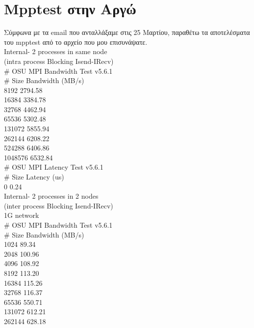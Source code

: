 \section*{Mpptest στην Αργώ}
Σύμφωνα με τα email που ανταλλάξαμε στις 25 Μαρτίου, παραθέτω τα αποτελέσματα του mpptest από το αρχείο που μου επισυνάψατε. \\
\newline
Internal- 2 processes in same node \\
(intra process Blocking Isend-IRecv) \\
\# OSU MPI Bandwidth Test v5.6.1 \\
\# Size      Bandwidth (MB/s) \\
8192                 2794.58 \\
16384                3384.78 \\
32768                4462.94 \\
65536                5302.48 \\
131072               5855.94 \\
262144               6208.22 \\
524288               6406.86 \\
1048576              6532.84 \\
\# OSU MPI Latency Test v5.6.1 \\
\# Size          Latency (us) \\
0                       0.24 \\
\newline
Internal- 2 processes in 2 nodes \\
(inter process Blocking Isend-IRecv) \\
1G network \\
\# OSU MPI Bandwidth Test v5.6.1 \\
\# Size      Bandwidth (MB/s) \\
1024                   89.34 \\
2048                  100.96 \\
4096                  108.92 \\
8192                  113.20 \\
16384                 115.26 \\
32768                 116.37 \\
65536                 550.71 \\
131072                612.21 \\
262144                628.18 \\
